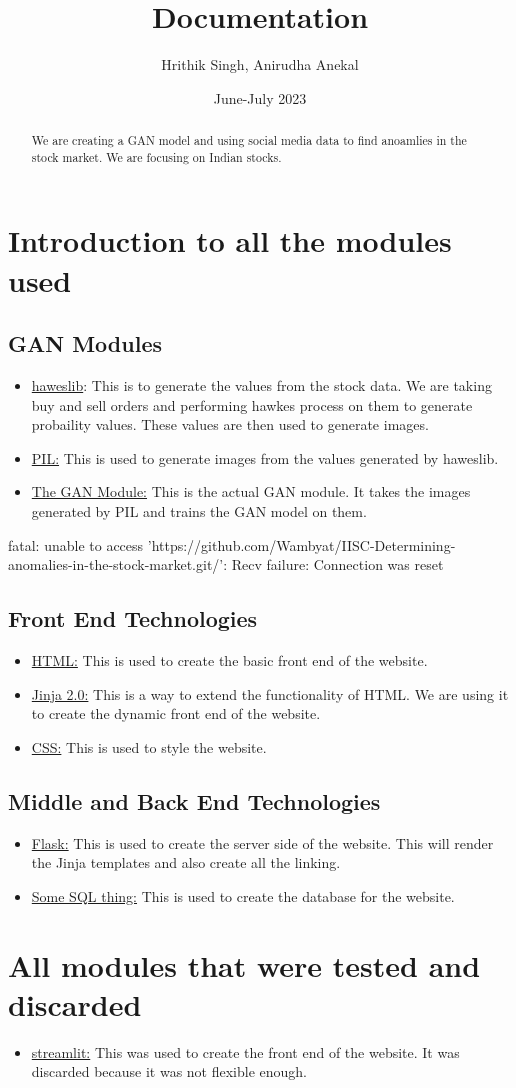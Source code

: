 \documentclass{article}
\begin{document}
\title{Documentation}
\author{Hrithik Singh, Anirudha Anekal}
\date{June-July 2023}
\maketitle
\begin{abstract}
We are creating a GAN model and using social media data to find anoamlies in the stock market. We are focusing on Indian stocks.
\end{abstract}
\section{Introduction to all the modules used}
\subsection{GAN Modules}
\begin{itemize}
\item \underline{haweslib}: This is to generate the values from the stock data. We are taking buy and sell orders and performing hawkes process on them to generate probaility values. These values are then used to generate images.
\item \underline{PIL:} This is used to generate images from the values generated by haweslib.
\item \underline{The GAN Module:} This is the actual GAN module. It takes the images generated by PIL and trains the GAN model on them.
\end{itemize}fatal: unable to access 'https://github.com/Wambyat/IISC-Determining-anomalies-in-the-stock-market.git/': Recv failure: Connection was reset
\subsection{Front End Technologies}
\begin{itemize}
\item \underline{HTML:} This is used to create the basic front end of the website.
\item \underline{Jinja 2.0:} This is a way to extend the functionality of HTML. We are using it to create the dynamic front end of the website.
\item \underline{CSS:} This is used to style the website.
\end{itemize}
\subsection{Middle and Back End Technologies}
\begin{itemize}
\item \underline{Flask:} This is used to create the server side of the website. This will render the Jinja templates and also create all the linking.
\item \underline{Some SQL thing:} This is used to create the database for the website.
\end{itemize}
\section{All modules that were tested and discarded}
\begin{itemize}
\item \underline{streamlit:} This was used to create the front end of the website. It was discarded because it was not flexible enough.
\end{itemize}
\end{document}
